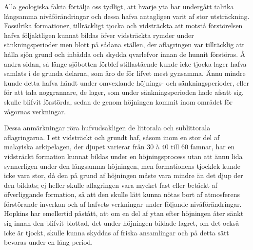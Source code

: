 Alla geologiska fakta förtälja oss tydligt, att hvarje yta har undergått talrika långsamma nivåförändringar och dessa hafva antagligen varit af stor utsträckning. Fossilrika formationer, tillräckligt tjocka och vidsträckta att motstå förstörelsen hafva följaktligen kunnat bildas öfver vidsträckta rymder under sänkningsperioder men blott på sådana ställen, der aflagringen var tillräcklig att hålla sjön grund och inbädda och skydda qvarlefvor innan de hunnit förstöras. Å andra sidan, så länge sjöbotten förblef stillastående kunde icke tjocka lager hafva samlats i de grunda delarna, som äro de för lifvet mest gynsamma. Ännu mindre kunde detta hafva händt under omvexlande höjnings- och sänkningsperioder, eller för att tala noggrannare, de lager, som under sänkningsperioden hade afsatt sig, skulle blifvit förstörda, sedan de genom höjningen kommit inom området för vågornas verkningar.

Dessa anmärkningar röra hufvudsakligen de littorala och sublittorala aflagringarna. I ett vidsträckt och grundt haf, såsom inom en stor del af malayiska arkipelagen, der djupet varierar från 30 à 40 till 60 famnar, har en vidsträckt formation kunnat bildas under en höjningsprocess utan att ännu lida synnerligen under den långsamma höjningen, men formationens tjocklek kunde icke vara stor, då den på grund af höjningen måste vara mindre än det djup der den bildats; ej heller skulle aflagringen vara mycket fast eller betäckt af öfverliggande formation, så att den skulle lätt kunna nötas bort af atmosferens förstörande inverkan och af hafvets verkningar under följande nivåförändringar. Hopkins har emellertid påstått, att om en del af ytan efter höjningen åter sänkt sig innan den blifvit blottad, det under höjningen bildade lagret, om det också icke är tjockt, skulle kunna skyddas af friska ansamlingar och på detta sätt bevaras under en lång period.

